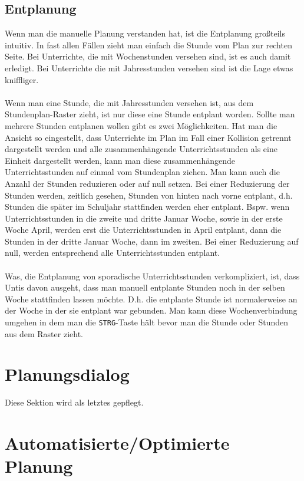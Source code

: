 \subsection{Entplanung}
\label{sec:manuelle-entplanung}

Wenn man die manuelle Planung verstanden hat, ist die Entplanung großteils intuitiv. In fast allen Fällen zieht man einfach die Stunde vom Plan zur rechten Seite. Bei Unterrichte, die mit Wochenstunden versehen sind, ist es auch damit erledigt. Bei Unterrichte die mit Jahresstunden versehen sind ist die Lage etwas kniffliger.\\
\\
Wenn man eine Stunde, die mit Jahresstunden versehen ist, aus dem Stundenplan-Raster zieht, ist nur diese eine Stunde entplant worden. Sollte man mehrere Stunden entplanen wollen gibt es zwei Möglichkeiten. Hat man die Ansicht so eingestellt, dass Unterrichte im Plan im Fall einer Kollision getrennt dargestellt werden und alle zusammenhängende Unterrichtsstunden als eine Einheit dargestellt werden, kann man diese zusammenhängende Unterrichtsstunden auf einmal vom Stundenplan ziehen. Man kann auch die Anzahl der Stunden reduzieren oder auf null setzen. Bei einer Reduzierung der Stunden werden, zeitlich gesehen, Stunden von hinten nach vorne entplant, d.h. Stunden die später im Schuljahr stattfinden werden eher entplant. Bspw. wenn Unterrichtsstunden in die zweite und dritte Januar Woche, sowie in der erste Woche April, werden erst die Unterrichtsstunden in April entplant, dann die Stunden in der dritte Januar Woche, dann im zweiten. Bei einer Reduzierung auf null, werden entsprechend alle Unterrichtsstunden entplant.\\
\\
Was, die Entplanung von sporadische Unterrichtsstunden verkompliziert, ist, dass Untis davon ausgeht, dass man manuell entplante Stunden noch in der selben Woche stattfinden lassen möchte. D.h. die entplante Stunde ist normalerweise an der Woche in der sie entplant war gebunden. Man kann diese Wochenverbindung umgehen in dem man die \texttt{STRG}-Taste hält bevor man die Stunde oder Stunden aus dem Raster zieht.

\section{Planungsdialog}

Diese Sektion wird als letztes gepflegt.

\section{Automatisierte/Optimierte Planung}

